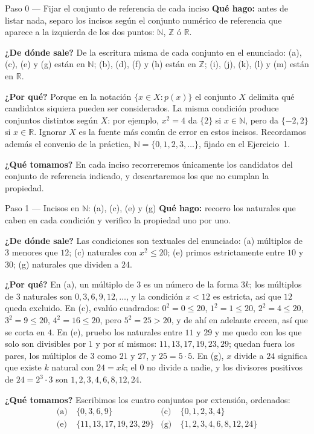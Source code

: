 \documentclass[11pt]{article}
\begin{document}
\begin{paso}{Paso 0 --- Fijar el conjunto de referencia de cada inciso}
\textbf{Qué hago:} antes de listar nada, separo los incisos según el conjunto numérico de
referencia que aparece a la izquierda de los dos puntos: $\mathbb{N}$, $\mathbb{Z}$ ó
$\mathbb{R}$.

\textbf{¿De dónde sale?} De la escritura misma de cada conjunto en el enunciado: (a), (c),
(e) y (g) están en $\mathbb{N}$; (b), (d), (f) y (h) están en $\mathbb{Z}$; (i), (j), (k),
(l) y (m) están en $\mathbb{R}$.

\textbf{¿Por qué?} Porque en la notación $\{x\in X: p(x)\}$ el conjunto $X$ delimita qué
candidatos siquiera pueden ser considerados. La misma condición produce conjuntos distintos
según $X$: por ejemplo, $x^{2}=4$ da $\{2\}$ si $x\in\mathbb{N}$, pero da $\{-2,2\}$ si
$x\in\mathbb{R}$. Ignorar $X$ es la fuente más común de error en estos incisos. Recordamos
además el convenio de la práctica, $\mathbb{N}=\{0,1,2,3,\dots\}$, fijado en el Ejercicio~1.

\textbf{¿Qué tomamos?} En cada inciso recorreremos únicamente los candidatos del conjunto de
referencia indicado, y descartaremos los que no cumplan la propiedad.
\end{paso}

\begin{paso}{Paso 1 --- Incisos en $\mathbb{N}$: (a), (c), (e) y (g)}
\textbf{Qué hago:} recorro los naturales que caben en cada condición y verifico la propiedad
uno por uno.

\textbf{¿De dónde sale?} Las condiciones son textuales del enunciado: (a) múltiplos de $3$
menores que $12$; (c) naturales con $x^{2}\le 20$; (e) primos estrictamente entre $10$ y
$30$; (g) naturales que dividen a $24$.

\textbf{¿Por qué?} En (a), un múltiplo de $3$ es un número de la forma $3k$; los múltiplos de
$3$ naturales son $0,3,6,9,12,\dots$, y la condición $x<12$ es estricta, así que $12$ queda
excluido. En (c), evalúo cuadrados: $0^{2}=0\le 20$, $1^{2}=1\le 20$, $2^{2}=4\le 20$,
$3^{2}=9\le 20$, $4^{2}=16\le 20$, pero $5^{2}=25>20$, y de ahí en adelante crecen, así que
se corta en $4$. En (e), pruebo los naturales entre $11$ y $29$ y me quedo con los que solo
son divisibles por $1$ y por sí mismos: $11,13,17,19,23,29$; quedan fuera los pares, los
múltiplos de $3$ como $21$ y $27$, y $25=5\cdot 5$. En (g), $x$ divide a $24$ significa que
existe $k$ natural con $24=xk$; el $0$ no divide a nadie, y los divisores positivos de
$24=2^{3}\cdot 3$ son $1,2,3,4,6,8,12,24$.

\textbf{¿Qué tomamos?} Escribimos los cuatro conjuntos por extensión, ordenados:
\begin{align*}
	\text{(a)}\ & \{0,3,6,9\} & \text{(c)}\ & \{0,1,2,3,4\}\\
	\text{(e)}\ & \{11,13,17,19,23,29\} & \text{(g)}\ & \{1,2,3,4,6,8,12,24\}
\end{align*}
\end{paso}
\end{document}
